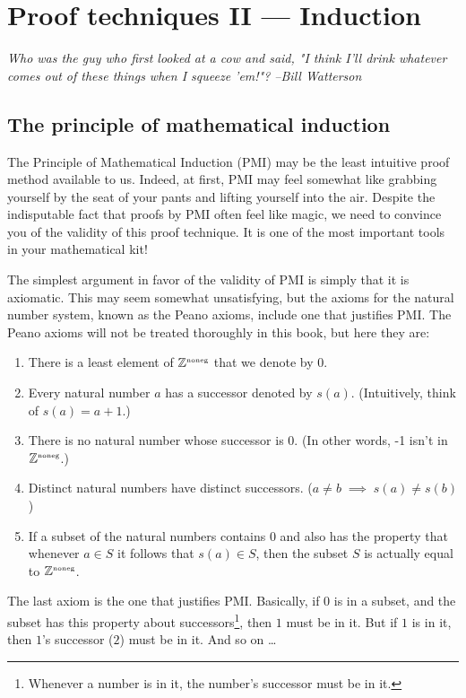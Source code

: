
\chapter{Proof techniques II --- Induction}
\label{ch:proof2}

{\em Who was the guy who first looked at a cow and said, "I think I'll drink whatever comes out of these things when I squeeze 'em!"? --Bill Watterson}

\section{The principle of mathematical induction}
\label{sec:induct}

The Principle of Mathematical Induction (PMI) may be the least intuitive
proof method available to us.  Indeed, at first, PMI may feel somewhat like
grabbing yourself by the seat of your pants and lifting yourself into
the air.  Despite the indisputable fact that proofs by PMI often feel
like magic, we need to convince you of the validity of this proof
technique.  It is one of the most important tools in your mathematical
kit!

The simplest argument in favor of the validity of PMI is simply that it is
axiomatic.  This may seem somewhat unsatisfying, but the axioms for
the natural number system, known as the Peano axioms,
include one that justifies PMI.  The Peano axioms will not be treated 
thoroughly in this book, but here they are:

\begin{enumerate}
\item[i)] There is a least element of ${\mathbb Z}^{\mbox{\tiny noneg}}$ that we denote by $0$.
\item[ii)] Every natural number $a$ has a successor denoted by $s(a)$.
(Intuitively, think of $s(a) = a+1$.)
\item[iii)] There is no natural number whose successor is $0$.  (In other
words, -1 isn't in ${\mathbb Z}^{\mbox{\tiny noneg}}$.)
\item[iv)] Distinct natural numbers have distinct successors.  
($a \neq b \; \implies \; s(a) \neq s(b)$) 
\item[v)] If a subset of the natural numbers contains $0$ and also has the
property that whenever $a \in S$ it follows that $s(a) \in S$, then the
subset $S$ is actually equal to ${\mathbb Z}^{\mbox{\tiny noneg}}$.   
\end{enumerate}

The last axiom is the one that justifies PMI.  Basically, if $0$ is in
a subset, and the subset has this property about successors\footnote{Whenever a number is in it, the number's successor must be in it.}, then $1$ must
be in it.  But if $1$ is in it, then $1$'s successor ($2$) must be in it.
And so on \ldots  

